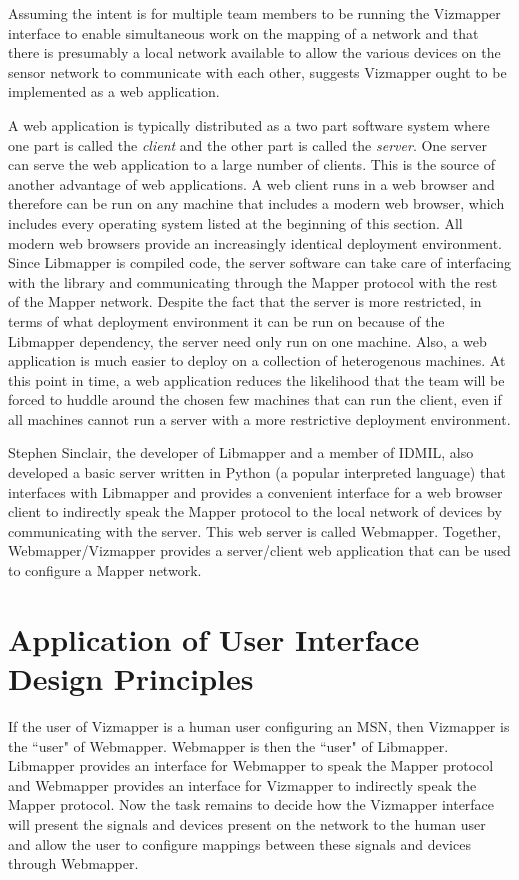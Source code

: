 Assuming the intent is for multiple team members to be running the Vizmapper interface to enable simultaneous work on the mapping of a network and that there is presumably a local network available to allow the various devices on the sensor network to communicate with each other, suggests Vizmapper ought to be implemented as a web application. 

A web application is typically distributed as a two part software system where one part is called the \emph{client} and the other part is called the \emph{server}. One server can serve the web application to a large number of clients. This is the source of another advantage of web applications. A web client runs in a web browser and therefore can be run on any machine that includes a modern web browser, which includes every operating system listed at the beginning of this section. All modern web browsers provide an increasingly identical deployment environment. Since Libmapper is compiled code, the server software can take care of interfacing with the library and communicating through the Mapper protocol with the rest of the Mapper network. Despite the fact that the server is more restricted, in terms of what deployment environment it can be run on because of the Libmapper dependency, the server need only run on one machine. Also, a web application is much easier to deploy on a collection of heterogenous machines. At this point in time, a web application reduces the likelihood that the team will be forced to huddle around the chosen few machines that can run the client, even if all machines cannot run a server with a more restrictive deployment environment.

Stephen Sinclair, the developer of Libmapper and a member of IDMIL, also developed a basic server written in Python (a popular interpreted language) that interfaces with Libmapper and provides a convenient interface for a web browser client to indirectly speak the Mapper protocol to the local network of devices by communicating with the server. This web server is called Webmapper. Together, Webmapper/Vizmapper provides a server/client web application that can be used to configure a Mapper network.

\section{Application of User Interface Design Principles}
\label{sec:userInterface}

If the user of Vizmapper is a human user configuring an MSN, then Vizmapper is the ``user" of Webmapper. Webmapper is then the ``user" of Libmapper. Libmapper provides an interface for Webmapper to speak the Mapper protocol and Webmapper provides an interface for Vizmapper to indirectly speak the Mapper protocol. Now the task remains to decide how the Vizmapper interface will present the signals and devices present on the network to the human user and allow the user to configure mappings between these signals and devices through Webmapper.

